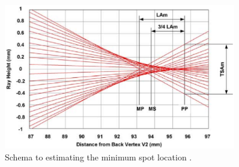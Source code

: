 \begin{figure}[!ht]
\centering
\includegraphics[width=0.9\textwidth]{bilder/min_max_spot}
\caption{Schema to estimating the minimum spot location \cite{lens_theory_LC_Ltd}.}
\label{fig:min_max_spot}
\end{figure}

